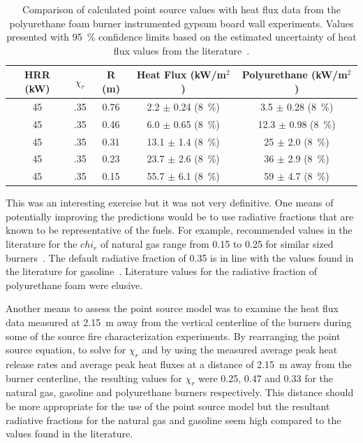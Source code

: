 \documentclass[twoside]{uocthesis}
\begin{document}
{\begin{table}
	\centering
	\footnotesize
	\begin{tabular}{|c|c|c|c|c|}
	\hline
		HRR (kW) &   $\chi_r$   & R (m)	     & Heat Flux (kW/m$^2$)     &  Polyurethane (kW/m$^2$)    	\\ \hline 
		45       &   .35 		& 0.76 	     & 2.2 $\pm$ 0.24 (8~\%) 	&  3.5 $\pm$ 0.28 (8~\%) 	   	 \\
		45       &   .35    	& 0.46	     & 6.0 $\pm$ 0.65 (8~\%) 	&  12.3 $\pm$ 0.98 (8~\%)  	     \\
		45       &   .35 		& 0.31	     & 13.1 $\pm$ 1.4 (8~\%) 	&  25 $\pm$ 2.0 (8~\%)   	      \\
        45       &   .35 		& 0.23	     & 23.7 $\pm$ 2.6 (8~\%) 	&  36 $\pm$ 2.9 (8~\%)		      \\
        45       &   .35 		& 0.15	     & 55.7 $\pm$ 6.1 (8~\%) 	&  59 $\pm$ 4.7 (8~\%)   	       \\
	\hline
	\end{tabular}
	\caption[Comparison of calculated point source values (HRR = 45~kW) with heat flux data from the instrumented gypsum board wall experiments]{Comparison of calculated point source values with heat flux data from the polyurethane foam burner instrumented gypsum board wall experiments. Values presented with 95~\% confidence limits based on the estimated uncertainty of heat flux values from the literature~\cite{Bryant:2003,Pitts:2006}.}
	\label{tab:Point_Source_HFPUF}
\end{table}

This was an interesting exercise but it was not very definitive.  One means of potentially improving the predictions would be to use radiative fractions that are known to be representative of the fuels. For example, recommended values in the literature for the $chi_r$ of natural gas range from 0.15 to 0.25 for similar sized burners~\cite{Hostikka:3,McCaffrey:1982}.  The default radiative fraction of 0.35 is in line with the values found in the literature for gasoline~\cite{Hamins:1991,McGrattan:2000}.  Literature values for the radiative fraction of polyurethane foam were elusive. 

Another means to assess the point source model was to examine the heat flux data measured at 2.15~m away from the vertical centerline of the burners during some of the source fire characterization experiments. By rearranging the point source equation, to solve for $\chi_r$ and by using the measured average peak heat release rates and average peak heat fluxes at a distance of 2.15~m away from the burner centerline, the resulting values for $\chi_r$ were 0.25, 0.47 and 0.33 for the natural gas, gasoline and polyurethane burners respectively.  This distance should be more appropriate for the use of the point source model but the resultant radiative fractions for the natural gas and gasoline seem high compared to the values found in the literature.  

}
\end{document}
